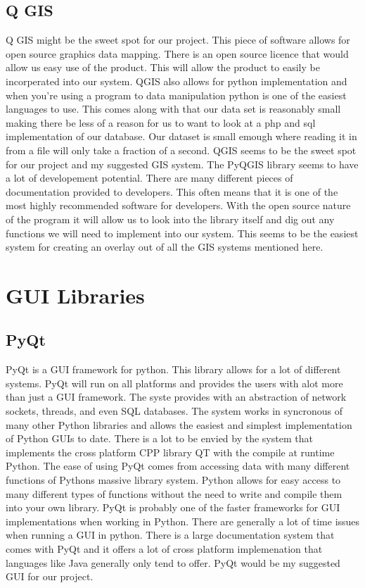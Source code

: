 \documentclass[onecolumn, draftclsnofoot,10pt, compsoc]{IEEEtran}
\begin{document}
      \subsection{Q GIS}
        Q GIS might be the sweet spot for our project. This piece of software allows for open source graphics data mapping. There is an open source licence that would allow us easy use of the product. This will allow the product to easily be incorperated into our system. QGIS also allows for python implementation and when you're using a program to data manipulation python is one of the easiest languages to use. This comes along with that our data set is reasonably small making there be less of a reason for us to want to look at a php and sql implementation of our database. Our dataset is small emough where reading it in from a file will only take a fraction of a second. QGIS seems to be the sweet spot for our project and my suggested GIS system. The PyQGIS library seems to have a lot of developement potential. There are many different pieces of documentation provided to developers. This often means that it is one of the most highly recommended software for developers. With the open source nature of the program it will allow us to look into the library itself and dig out any functions we will need to implement into our system. This seems to be the easiest system for creating an overlay out of all the GIS systems mentioned here.
      \section{GUI Libraries}
      \subsection{PyQt}
      PyQt is a GUI framework for python. This library allows for a lot of different systems. PyQt will run on all platforms and provides the users with alot more than just a GUI framework. The syste provides with an abstraction of network sockets, threads, and even SQL databases. The system works in syncronous of many other Python libraries and allows the easiest and simplest implementation of Python GUIs to date. There is a lot to be envied by the system that implements the cross platform CPP library QT with the compile at runtime Python. The ease of using PyQt comes from accessing data with many different functions of Pythons massive library system. Python allows for easy access to many different types of functions without the need to write and compile them into your own library. PyQt is probably one of the faster frameworks for GUI implementations when working in Python. There are generally a lot of time issues when running a GUI in python. There is a large documentation system that comes with PyQt and it offers a lot of cross platform implemenation that languages like Java generally only tend to offer. PyQt would be my suggested GUI for our project.
\end{document}
